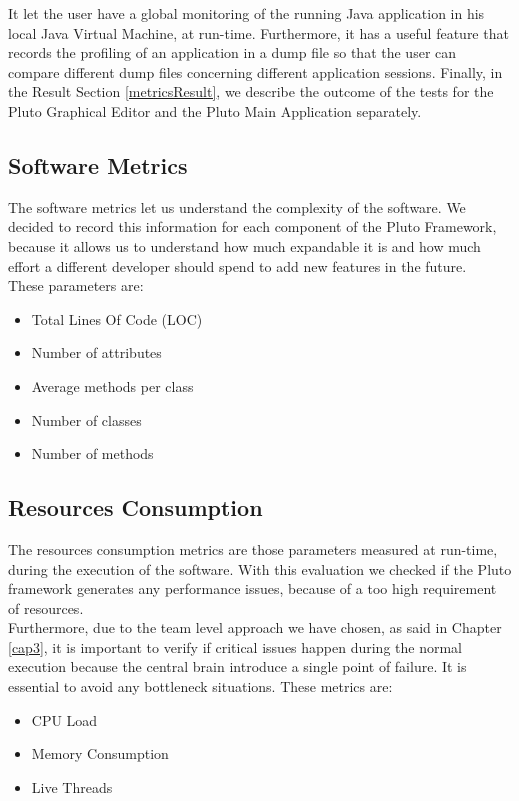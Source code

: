 It let the user have a global monitoring of the running Java application in his local Java Virtual Machine, at run-time. Furthermore, it has a useful feature that records the profiling of an application in a dump file so that the user can compare different dump files concerning different application sessions.
Finally, in the Result Section \ref{metricsResult}, we describe the outcome of the tests for the Pluto Graphical Editor and the Pluto Main Application separately.

\subsection{Software Metrics}

The software metrics let us understand the complexity of the software.
We decided to record this information for each component of the Pluto Framework, because it allows us to understand how much expandable it is and how much effort a different developer should spend to add new features in the future.
\\

These parameters are:

\begin{itemize}
\item Total Lines Of Code (LOC)
\item Number of attributes
\item Average methods per class
\item Number of classes
\item Number of methods
\end{itemize}

\subsection{Resources Consumption}

The resources consumption metrics are those parameters measured at run-time, during the execution of the software.
With this evaluation we checked if the Pluto framework generates any performance issues, because of a too high requirement of resources. 
\\
Furthermore, due to the team level approach we have chosen, as said in Chapter \ref{cap3}, it is important to verify if critical issues happen during the normal execution because the central brain introduce a single point of failure. It is essential to avoid any bottleneck situations.
These metrics are:

\begin{itemize}
\item CPU Load
\item Memory Consumption
\item Live Threads
\end{itemize}


